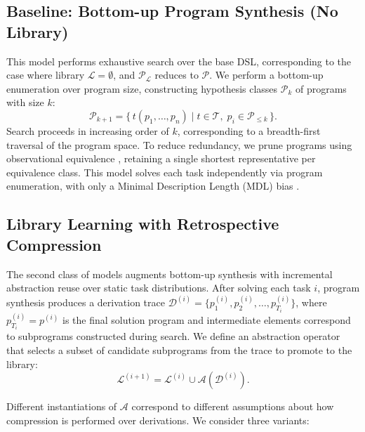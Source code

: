 \documentclass{article}
\begin{document}
\subsection{Baseline: Bottom-up Program Synthesis (No Library)}

This model performs exhaustive search %
over the base DSL, 
corresponding to the case where library $\mathcal{L} = \emptyset$, and   $\mathcal{P}_{\mathcal{L}}$ reduces to $\mathcal{P}$.  We perform a bottom-up enumeration over program size, constructing hypothesis classes $\mathcal{P}_k$ of programs with size $k$:
\[
\mathcal{P}_{k+1} = \{\, t(p_1,\ldots,p_n) \mid t \in \mathcal{T},\; p_i \in \mathcal{P}_{\le k} \,\}.
\]
Search proceeds in increasing order of $k$, corresponding to a breadth-first traversal of the program space. To reduce redundancy, we prune programs using observational equivalence \citep{albarghouthi2013recursive,udupa2013transit}, retaining a single shortest representative per equivalence class.  
This model solves each task independently via program enumeration, with only a Minimal Description Length (MDL) bias \cite{chater1999search,chater2003simplicity,rule2024symbolic}. 


\subsection{Library Learning with Retrospective Compression}

The second class of models augments bottom-up synthesis with incremental abstraction reuse over static task distributions. After solving each task $i$, program synthesis produces a derivation trace $\mathcal{D}^{(i)} = \{p^{(i)}_1, p^{(i)}_2, \ldots, p^{(i)}_{T_i}\}$,
where $p^{(i)}_{T_i} = p^{(i)}$ is the final solution program and intermediate elements correspond to subprograms constructed during search. We define an abstraction operator that selects a subset of candidate subprograms from the trace to promote to the library:
\[
\mathcal{L}^{(i+1)} = \mathcal{L}^{(i)} \cup \mathcal{A}(\mathcal{D}^{(i)}).
\]


Different instantiations of $\mathcal{A}$ correspond to different assumptions about how compression is performed over derivations.  We consider three variants:
\end{document}

